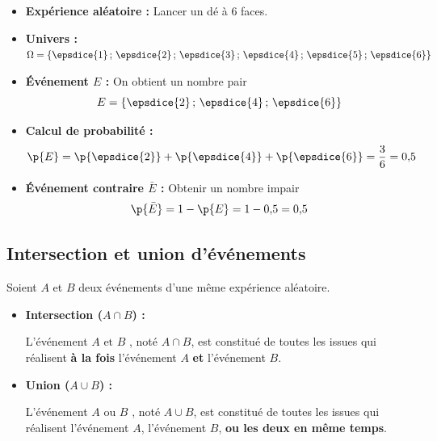 \begin{ex}
	\nline

	\begin{itemize}
		\item \textbf{Expérience aléatoire :} Lancer un dé à 6 faces.
		\item \textbf{Univers :} $\Omega = \left\{\epsdice{1}\,;\,\epsdice{2}\,;\,\epsdice{3}\,;\,\epsdice{4}\,;\,\epsdice{5}\,;\,\epsdice{6}\right\}$
		\item \textbf{Événement $E$ :} \og{} On obtient un nombre pair \fg{}
		      \[
			      E = \left\{\epsdice{2}\,;\,\epsdice{4}\,;\,\epsdice{6}\right\}
		      \]
		\item \textbf{Calcul de probabilité :}
		      \[
			      \p{E} = \p{\epsdice{2}} + \p{\epsdice{4}} + \p{\epsdice{6}} = \dfrac{3}{6} = 0{,}5
		      \]
		\item \textbf{Événement contraire $\bar{E}$ :} \og{} Obtenir un nombre impair \fg{}
		      \[
			      \p{\bar{E}} = 1 - \p{E} = 1 - 0{,}5 = 0{,}5
		      \]
	\end{itemize}
\end{ex}

\subsection{Intersection et union d'événements}

\begin{prop}
	Soient $A$ et $B$ deux événements d'une même expérience aléatoire.

	\begin{itemize}
		\item \textbf{Intersection ($A \cap B$) :}

		      L'événement \og{} $A \text{ et } B$ \fg{}, noté $A \cap B$, est constitué de toutes les issues qui réalisent \textbf{à la fois} l'événement $A$ \textbf{et} l'événement $B$.

		\item \textbf{Union ($A \cup B$) :}

		      L'événement \og{} $A \text{ ou } B$ \fg{}, noté $A \cup B$, est constitué de toutes les issues qui réalisent l'événement $A$, l'événement $B$, \textbf{ou les deux en même temps}.
	\end{itemize}
\end{prop}

